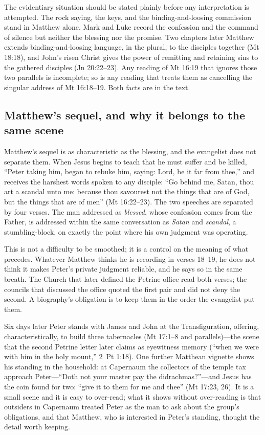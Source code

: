 The evidentiary situation should be stated plainly before any interpretation
is attempted. The rock saying, the keys, and the binding-and-loosing
commission stand in Matthew alone. Mark and Luke record the confession and
the command of silence but neither the blessing nor the promise. Two chapters
later Matthew extends binding-and-loosing language, in the plural, to the
disciples together (Mt 18:18), and John's risen Christ gives the power of
remitting and retaining sins to the gathered disciples (Jn 20:22--23). Any
reading of Mt 16:19 that ignores those two parallels is incomplete; so is any
reading that treats them as cancelling the singular address of Mt 16:18--19.
Both facts are in the text.

\subsection{Matthew's sequel, and why it belongs to the same scene}

Matthew's sequel is as characteristic as the blessing, and the evangelist
does not separate them. When Jesus begins to teach that he must suffer and be
killed, ``Peter taking him, began to rebuke him, saying: Lord, be it far from
thee,'' and receives the harshest words spoken to any disciple: ``Go behind
me, Satan, thou art a scandal unto me: because thou savourest not the things
that are of God, but the things that are of men'' (Mt 16:22--23). The two
speeches are separated by four verses. The man addressed as \textit{blessed},
whose confession comes from the Father, is addressed within the same
conversation as \textit{Satan} and \textit{scandal}, a stumbling-block, on
exactly the point where his own judgment was operating.

This is not a difficulty to be smoothed; it is a control on the meaning of
what precedes. Whatever Matthew thinks he is recording in verses 18--19, he
does not think it makes Peter's private judgment reliable, and he says so in
the same breath. The Church that later defined the Petrine office read both
verses; the councils that discussed the office quoted the first pair and did
not deny the second. A biography's obligation is to keep them in the order
the evangelist put them.

Six days later Peter stands with James and John at the Transfiguration,
offering, characteristically, to build three tabernacles (Mt 17:1--8 and
parallels)---the scene that the second Petrine letter later claims as
eyewitness memory (``when we were with him in the holy mount,'' 2~Pt 1:18).
One further Matthean vignette shows his standing in the household: at
Capernaum the collectors of the temple tax approach Peter---``Doth not your
master pay the didrachmas?''---and Jesus has the coin found for two: ``give
it to them for me and thee'' (Mt 17:23, 26). It is a small scene and it is
easy to over-read; what it shows without over-reading is that outsiders in
Capernaum treated Peter as the man to ask about the group's obligations, and
that Matthew, who is interested in Peter's standing, thought the detail worth
keeping.
